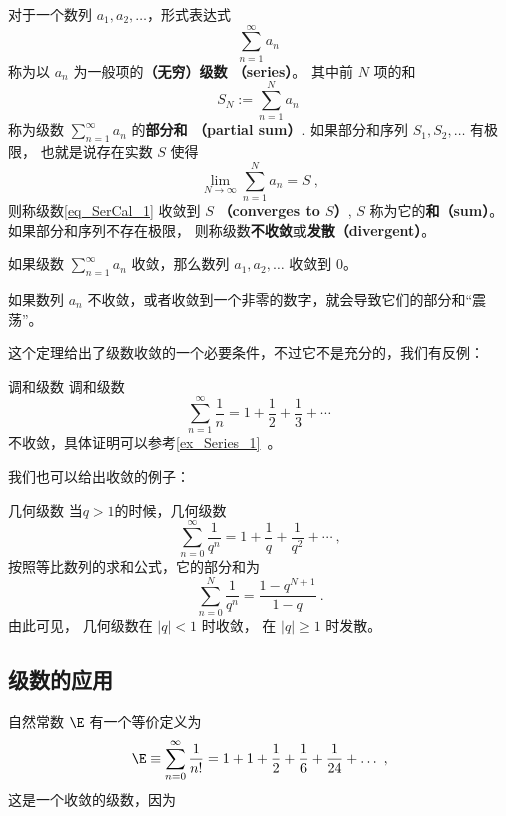 
\begin{issues}
\issueDraft
\end{issues}


对于一个数列 $a_1,a_2,\dots$，形式表达式
\begin{equation}\label{eq_SerCal_1}
\sum_{n=1}^\infty a_n~
\end{equation}
称为以 $a_n$ 为一般项的\textbf{（无穷）级数 （series）}。 其中前 $N$ 项的和
\begin{equation}
S_N:=\sum_{n=1}^N a_n~
\end{equation}
称为级数 $\sum_{n=1}^\infty a_n$ 的\textbf{部分和 （partial sum）}. 如果部分和序列 $S_1,S_2,\dots$ 有极限， 也就是说存在实数 $S$ 使得
\begin{equation}
\lim_{N\to\infty}\sum_{n=1}^N a_n=S~,
\end{equation}
则称级数\autoref{eq_SerCal_1} 收敛到 $S$ \textbf{（converges to $S$）}, $S$ 称为它的\textbf{和（sum）}。 如果部分和序列不存在极限， 则称级数\textbf{不收敛}或\textbf{发散（divergent）}。

\begin{theorem}{}
如果级数 $\sum_{n=1}^\infty a_n$ 收敛，那么数列 $a_1, a_2, \dots$ 收敛到 $0$。
\end{theorem}
如果数列 $a_n$ 不收敛，或者收敛到一个非零的数字，就会导致它们的部分和“震荡”。

这个定理给出了级数收敛的一个必要条件，不过它不是充分的，我们有反例：
\begin{example}{调和级数}
调和级数
$$
\sum_{n=1}^\infty\frac{1}{n} = 1 + \frac12 + \frac13 + \cdots~
$$
不收敛，具体证明可以参考\autoref{ex_Series_1}~。
\end{example}

我们也可以给出收敛的例子：
\begin{example}{几何级数}
当$q > 1$的时候，几何级数
$$
\sum_{n=0}^\infty \frac1{q^n} = 1 + \frac1{q} + \frac1{q^2} + \cdots~,
$$
按照等比数列的求和公式，它的部分和为
$$
\sum_{n=0}^N \frac1{q^n} =\frac{1-q^{N+1}}{1-q}~.
$$
由此可见， 几何级数在 $|q|<1$ 时收敛， 在 $|q|\geq1$ 时发散。
\end{example}






\subsection{级数的应用}



自然常数 $\E$ 有一个等价定义为
\begin{equation}
\E \equiv \sum_{n=0}^\infty \frac{1}{n!} = 1 + 1 + \frac{1}{2} + \frac{1}{6} + \frac{1}{24} +\dots~,
\end{equation}
这是一个收敛的级数，因为
